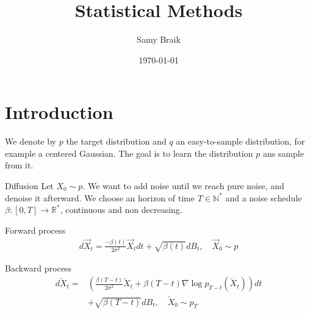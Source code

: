 \documentclass{beamer}
\title{Statistical Methods}
\author{Samy Braik}
\date{\today}
\begin{document}
\begin{frame}
    \titlepage
\end{frame}

\section{Introduction}

\begin{frame}
    We denote by \(p\) the target distribution and \(q\) an easy-to-sample distribution, for example a centered Gaussian. The goal is to learn the distribution \(p\) ans sample from it.\\
\end{frame}

\begin{frame}{Diffusion}
    Let \(X_0\sim p\). We want to add noise until we reach pure noise, and denoise it afterward. We choose an horizon of time \(T\in\mathbb{N}^*\) and a noise schedule \(\beta:[0,T]\rightarrow\mathbb{R}^*\), continuous and non decreasing.

    \begin{block}{Forward process}
        \begin{align}
            d\overrightarrow{X}_t = \frac{-\beta(t)}{2\sigma^2}\overrightarrow{X}_t dt + \sqrt{\beta(t)}dB_t, \quad \overrightarrow{X}_0\sim p
        \end{align}
    \end{block}

    \begin{block}{Backward process}
        \begin{align}
            d\overleftarrow{X}_t=&\left(  \frac{\beta(T-t)}{2\sigma^2}\overleftarrow{X}_t+\beta(T-t)\nabla\log p_{T-t}\left(\overleftarrow{X}_t \right)  \right)dt \\ &+ \sqrt{\beta(T-t)}dB_t, \quad \overleftarrow{X}_0\sim p_T \nonumber
        \end{align}
            
    \end{block}
\end{frame}
\end{document}
